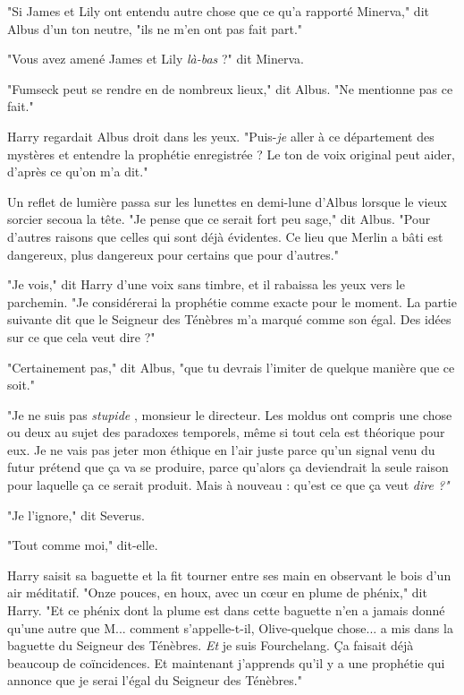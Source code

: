 "Si James et Lily ont entendu autre chose que ce qu'a rapporté Minerva," dit Albus d'un ton neutre, "ils ne m'en ont pas fait part."

"Vous avez amené James et Lily \emph{là-bas } ?" dit Minerva.

"Fumseck peut se rendre en de nombreux lieux," dit Albus. "Ne mentionne pas ce fait."

Harry regardait Albus droit dans les yeux. "Puis-\emph{je}  aller à ce département des mystères et entendre la prophétie enregistrée ? Le ton de voix original peut aider, d'après ce qu'on m'a dit."

Un reflet de lumière passa sur les lunettes en demi-lune d'Albus lorsque le vieux sorcier secoua la tête. "Je pense que ce serait fort peu sage," dit Albus. "Pour d'autres raisons que celles qui sont déjà évidentes. Ce lieu que Merlin a bâti est dangereux, plus dangereux pour certains que pour d'autres."

"Je vois," dit Harry d'une voix sans timbre, et il rabaissa les yeux vers le parchemin. "Je considérerai la prophétie comme exacte pour le moment. La partie suivante dit que le Seigneur des Ténèbres m'a marqué comme son égal. Des idées sur ce que cela veut dire ?"

"Certainement pas," dit Albus, "que tu devrais l'imiter de quelque manière que ce soit."

"Je ne suis pas \emph{stupide} , monsieur le directeur. Les moldus ont compris une chose ou deux au sujet des paradoxes temporels, même si tout cela est théorique pour eux. Je ne vais pas jeter mon éthique en l'air juste parce qu'un signal venu du futur prétend que ça va se produire, parce qu'alors ça deviendrait la seule raison pour laquelle ça ce serait produit. Mais à nouveau : qu'est ce que ça veut \emph{dire ?"} 

"Je l'ignore," dit Severus.

"Tout comme moi," dit-elle.

Harry saisit sa baguette et la fit tourner entre ses main en observant le bois d'un air méditatif. "Onze pouces, en houx, avec un cœur en plume de phénix," dit Harry. "Et ce phénix dont la plume est dans cette baguette n'en a jamais donné qu'une autre que M... comment s'appelle-t-il, Olive-quelque chose... a mis dans la baguette du Seigneur des Ténèbres. \emph{Et}  je suis Fourchelang. Ça faisait déjà beaucoup de coïncidences. Et maintenant j'apprends qu'il y a une prophétie qui annonce que je serai l'égal du Seigneur des Ténèbres."

